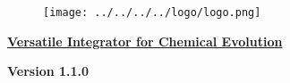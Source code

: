 
\begin{center} 
\begin{figure}[!h] 
\centering 
\texttt{[image: ../../../../logo/logo.png]} 
\end{figure} 
\underline{\LARGE \textbf{Versatile Integrator for Chemical Evolution}} 
\par 
{\Large \textbf{Version 1.1.0}} 
\end{center}
